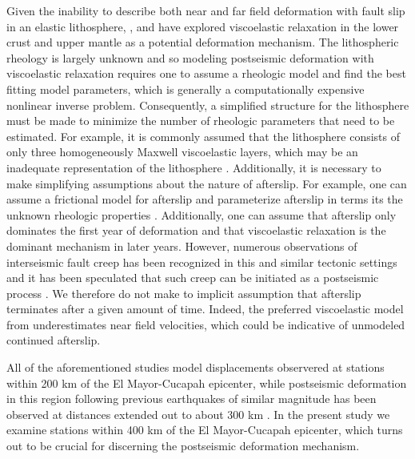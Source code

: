 \documentclass[12pt]{article}
\begin{document}
Given the inability to describe both near and far field deformation with fault slip in an elastic lithosphere, \citet{Pollitz2012}, \citet{Rollins2015} and \citet{Spinler2015} have explored viscoelastic relaxation in the lower crust and upper mantle as a potential deformation mechanism. The lithospheric rheology is largely unknown and so modeling postseismic deformation with viscoelastic relaxation requires one to assume a rheologic model and find the best fitting model parameters, which is generally a computationally expensive nonlinear inverse problem. Consequently, a simplified structure for the lithosphere must be made to minimize the number of rheologic parameters that need to be estimated.  For example, it is commonly assumed that the lithosphere consists of only three homogeneously Maxwell viscoelastic layers, which may be an inadequate representation of the lithosphere \citep[e.g.][]{Hines2013,Riva2009}. Additionally, it is necessary to make simplifying assumptions about the nature of afterslip. For example, one can assume a frictional model for afterslip and parameterize afterslip in terms its the unknown rheologic properties \citep[e.g.][]{Johnson2009,Johnson2004}. Additionally, one can assume that afterslip only dominates the first year of deformation \citep[e.g.][]{Pollitz2012,Spinler2015} and that viscoelastic relaxation is the dominant mechanism in later years. However, numerous observations of interseismic fault creep has been recognized in this and similar tectonic settings and it has been speculated that such creep can be initiated as a postseismic process \citep{Cakir2012,Cetin2014}.  We therefore do not make to implicit assumption that afterslip terminates after a given amount of time.  Indeed, the preferred viscoelastic model from \citet{Pollitz2012} underestimates near field velocities, which could be indicative of unmodeled continued afterslip.

All of the aforementioned studies model displacements observered at stations within 200 km of the El Mayor-Cucapah epicenter, while postseismic deformation in this region following previous earthquakes of similar magnitude has been observed at distances extended out to about 300 km \citep{Freed2007a}. In the present study we examine stations within 400 km of the El Mayor-Cucapah epicenter, which turns out to be crucial for discerning the postseismic deformation mechanism.
\end{document}

